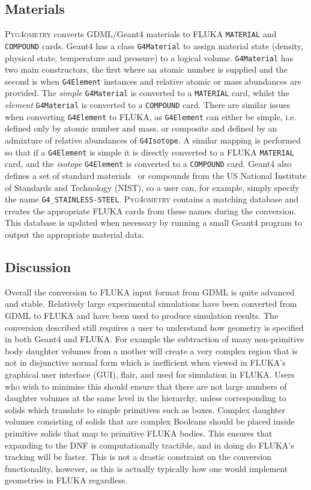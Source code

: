 \documentclass[final,5p,times,twocolumn]{elsarticle}
\newcommand{\pyinline}[1]{\lstinline[postbreak={}]{#1}}
\newcommand{\cpinline}[1]{\lstinline[postbreak={}]{#1}}
\newcommand{\fluka}[1]{\texttt{\MakeUppercase{#1}}}
\newcommand{\PYGEOMETRY}{\textsc{Pyg4ometry}}
\begin{document}
\subsection{Materials}
\PYGEOMETRY{} converts GDML/Geant4 materials to FLUKA \verb|MATERIAL| and \verb|COMPOUND| cards.
Geant4 has a class \cpinline{G4Material} to assign material state (density, physical state, temperature and pressure)
to a logical volume. \cpinline{G4Material} has two main constructors, the first where an atomic number is supplied and
the second is when \cpinline{G4Element} instances and relative atomic or mass abundances are provided. The {\em simple}
\cpinline{G4Material} is converted to a \fluka{material} card, whilst the {\em element} \cpinline{G4Material}  is converted to a
\fluka{compound} card. There are similar issues when converting \cpinline{G4Element} to FLUKA, as \cpinline{G4Element}
can either be simple, i.e. defined only by atomic number and mass, or composite and defined by an admixture of
relative abundances of \cpinline{G4Isotope}. A similar mapping is performed so that if a \cpinline{G4Element} is simple it is
directly converted to a FLUKA \fluka{MATERIAL} card, and the {\it isotope} \cpinline{G4Element} is converted to a \fluka{compound}
card. Geant4 also defines a set of standard materials~\cite{Geant4MaterialDB} or compounds from the US National Institute
of Standards and Technology (NIST), so a user can, for example, simply
specify the name \pyinline{G4_STAINLESS-STEEL}. \PYGEOMETRY{}  contains a matching database and creates the appropriate FLUKA
cards from these names during the conversion. This database is updated when
necessary by running a small Geant4 program to output the appropriate material data.

\subsection{Discussion}
Overall the conversion to FLUKA input format from GDML is quite advanced
and stable. Relatively large experimental simulations have been converted
from GDML to FLUKA and have been used to produce simulation results. The
conversion described still requires a user to understand how geometry is
specified in both Geant4 and FLUKA. For example the subtraction of many
non-primitive body daughter volumes from a mother will create a very
complex region that is not in disjunctive normal form which is inefficient
when viewed in FLUKA's graphical user interface (GUI), flair, and used for
simulation in FLUKA.  Users who wish to minimise this should ensure that
there are not large numbers of daughter volumes at the same level in the
hierarchy, unless corresponding to solids which translate to simple
primitives such as boxes.  Complex daughter volumes consisting of solids
that are complex Booleans should be placed inside primitive solids that map
to primitive FLUKA bodies.  This ensures that expanding to the DNF is
computationally tractible, and in doing do FLUKA's tracking will be faster.
This is not a drastic constraint on the conversion functionality, however,
as this is actually typically how one would implement geometries in FLUKA
regardless.
\end{document}
